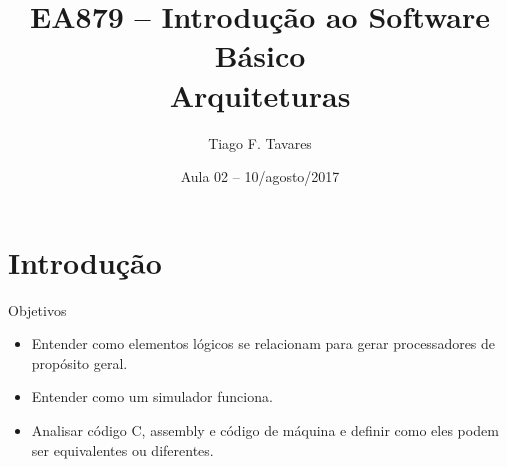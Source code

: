 \documentclass{beamer}
\title[02-Arquiteturas]{EA879 -- Introdução ao Software Básico\\Arquiteturas}
\author{Tiago F. Tavares}
\institute{FEEC -- UNICAMP}
\date{Aula 02 -- 10/agosto/2017}
\begin{document}
\begin{frame}
  \titlepage
\end{frame}


\section{Introdução}

\begin{frame}{Objetivos}
  \Large
  \begin{itemize}
    \item Entender como elementos lógicos se relacionam para gerar processadores
      de propósito geral.
    \item Entender como um simulador funciona.
    \item Analisar código C, assembly e código de máquina e definir como eles
      podem ser equivalentes ou diferentes.
  \end{itemize}
\end{frame}
\end{document}
